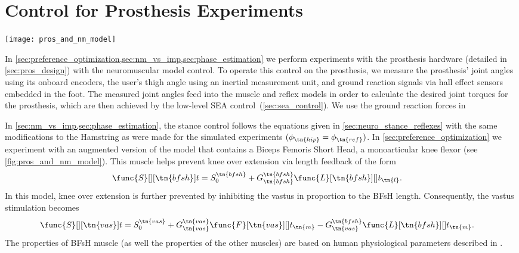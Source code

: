 \section{Control for Prosthesis Experiments}\label{sec:nm_control_prosthesis}

\begin{figure*}[htb]
    \centering
    \texttt{[image: pros\_and\_nm\_model]}
    \caption[Interaction between transfemoral prosthesis and neuromuscular
    control]{(a) Custom transfemoral prosthesis with series elastic actuators.
    In experiments in this thesis, we use an adaptor to test the prosthesis with
    able-bodied subjects. (b) During stance, we propose a control based on a
    neuromuscular model of human physiology that generates joint torques through
    virtual muscles that are stimulated by hypothesized local reflex
    pathways.}\label{fig:pros_and_nm_model}
\end{figure*}

In \cref{sec:preference_optimization,sec:nm_vs_imp,sec:phase_estimation} we
perform experiments with the prosthesis hardware (detailed in
\cref{sec:pros_design}) with the neuromuscular model control. To operate this
control on the prosthesis, we measure the prosthesis' joint angles using its
onboard encoders, the user's thigh angle using an inertial measurement unit, and
ground reaction signals via hall effect sensors embedded in the foot. The
measured joint angles feed into the muscle and reflex models in order to
calculate the desired joint torques for the prosthesis, which are then achieved
by the low-level SEA control~(\cref{sec:sea_control}). We use the ground
reaction forces in 

In \cref{sec:nm_vs_imp,sec:phase_estimation}, the stance control follows the
equations given in \cref{sec:neuro_stance_reflexes} with the same modifications
to the Hamstring as were made for the simulated experiments $(\phi_\tn{hip} =
\phi_\tn{ref})$. In \cref{sec:preference_optimization} we experiment with an
augmented version of the model that contains a Biceps Femoris Short Head, a
monoarticular knee flexor (see \cref{fig:pros_and_nm_model}). This muscle helps
prevent knee over extension via length feedback of the form
\begin{align}
    \func{S}[][\tn{bfsh}]{t} &= S_0^\tn{bfsh} + G_\tn{bfsh}^\tn{bfsh}
        \func{L}[\tn{bfsh}][]{t_\tn{l}}\label{eq:bfsh_stim}.
\end{align}
In this model, knee over extension is further prevented by inhibiting the vastus
in proportion to the BFsH length. Consequently, the vastus stimulation becomes 
\begin{align}
\func{S}[][\tn{vas}]{t} &= S_0^\tn{vas} 
    + G_\tn{vas}^\tn{vas} \func{F}[\tn{vas}][]{t_\tn{m}} 
    - G_\tn{vas}^\tn{bfsh} \func{L}[\tn{bfsh}][]{t_\tn{m}}.
    \label{eq:vas_stim_w_bfsh}
\end{align}
The properties of BFsH muscle (as well the properties of the other muscles) are
based on human physiological parameters described in \citet{song2015neural}.

